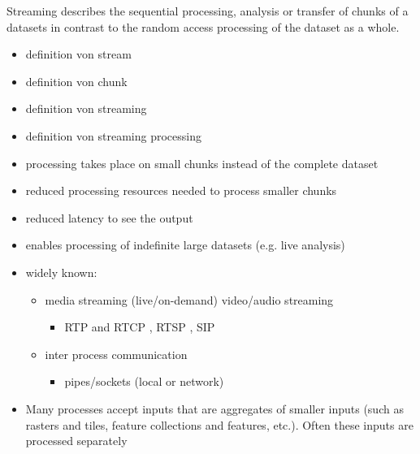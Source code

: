 	Streaming describes the sequential processing, analysis or transfer of chunks of a datasets in contrast to the random access processing of the dataset as a whole.

	\begin{itemize}
		\item definition von stream
		\item definition von chunk
		\item definition von streaming
		\item definition von streaming processing
		\item processing takes place on small chunks instead of the complete dataset
		\item reduced processing resources needed to process smaller chunks
		\item reduced latency to see the output
		\item enables processing of indefinite large datasets (e.g. live analysis)
		\item widely known:
		\begin{itemize}
			\item media streaming (live/on-demand) video/audio streaming
			\begin{itemize}
				\item RTP and RTCP \citep{ietf:rfc3550}, RTSP \citep{ietf:rfc2326}, SIP \citep{ietf:rfc3261}
			\end{itemize}
			\item inter process communication
			\begin{itemize}
				\item pipes/sockets (local or network) \citep{buschmann1996pattern}
			\end{itemize}
		\end{itemize}
		\item Many processes accept inputs that are aggregates of smaller inputs (such as rasters and tiles, feature collections and features, etc.). Often these inputs are processed separately
	\end{itemize}


